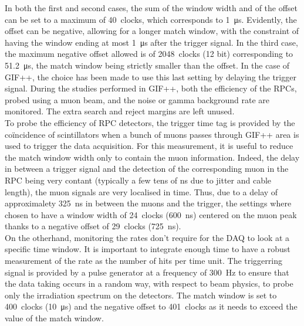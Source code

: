 	In both the first and second cases, the sum of the window width and of the offset can be set to a maximum of \SI{40}{clocks}, which corresponds to \SI{1}{\micro s}. Evidently, the offset can be negative, allowing for a longer match window, with the constraint of having the window ending at most \SI{1}{\micro s} after the trigger signal. In the third case, the maximum negative offset allowed is of \SI{2048}{clocks} (12 bit) corresponding to \SI{51.2}{\micro s}, the match window being strictly smaller than the offset. In the case of GIF++, the choice has been made to use this last setting by delaying the trigger signal. During the studies performed in GIF++, both the efficiency of the RPCs, probed using a muon beam, and the noise or gamma background rate are monitored. The extra search and reject margins are left unused.\\
	To probe the efficiency of RPC detectors, the trigger time tag is provided by the coïncidence of scintillators when a bunch of muons passes through GIF++ area is used to trigger the data acquisition. For this measurement, it is useful to reduce the match window width only to contain the muon information. Indeed, the delay in between a trigger signal and the detection of the corresponding muon in the RPC being very contant (typically a few tens of ns due to jitter and cable length), the muon signals are very localised in time. Thus, due to a delay of approximalety \SI{325}{ns} in between the muons and the trigger, the settings where chosen to have a window width of \SI{24}{clocks} (\SI{600}{ns}) centered on the muon peak thanks to a negative offset of \SI{29}{clocks} (\SI{725}{ns}).\\
	On the otherhand, monitoring the rates don't require for the DAQ to look at a specific time window. It is important to integrate enough time to have a robust measurement of the rate as the number of hits per time unit. The triggerring signal is provided by a pulse generator at a frequency of \SI{300}{Hz} to ensure that the data taking occurs in a random way, with respect to beam physics, to probe only the irradiation spectrum on the detectors. The match window is set to \SI{400}{clocks} (\SI{10}{\micro s}) and the negative offset to \SI{401}{clocks} as it needs to exceed the value of the match window.\\
	
